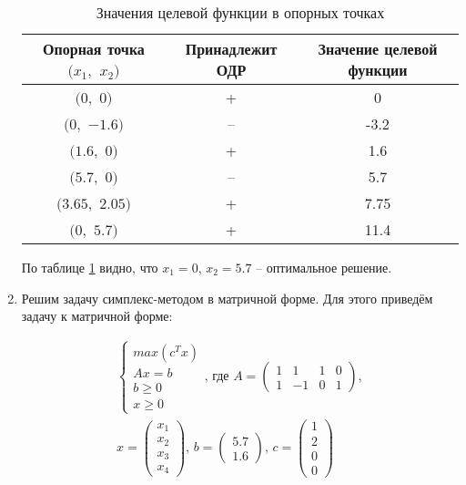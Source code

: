 \begin{enumerate}
\begin{table}[H]
\begin{center}
	\caption{Значения целевой функции в опорных точках}
	\label{tab:target-function}
	\def\tabcolsep{10pt}
	\def\arraystretch{1.23}
	\fontsize{13}{14}\selectfont
	\begin{tabular}{|c|c|c|}
		\hline 
		Опорная точка $(x_1,$ $x_2)$ & Принадлежит ОДР & Значение целевой функции \\ 
		\hline 
		$(0,$ $0)$ & + & 0 \\ 
		\hline 
		$(0,$ $-1.6)$ & -- & -3.2 \\ 
		\hline 
		$(1.6,$ $0)$ & + & 1.6 \\ 
		\hline 
		$(5.7,$ $0)$ & -- & 5.7 \\ 
		\hline 
		$(3.65,$ $2.05)$ & + & 7.75 \\ 
		\hline 
		$(0,$ $5.7)$ & + & 11.4 \\ 
	\hline 
	\end{tabular} 
\end{center}
\end{table}

По таблице \ref{tab:target-function} видно, что $x_1 = 0$, $x_2 = 5.7$ -- оптимальное решение.

\item Решим задачу симплекс-методом в матричной форме. Для этого приведём задачу к матричной форме:

\begin{equation}
\begin{aligned}
\begin{cases}
	max \left( c^T x \right)
	\\
	Ax = b
	\\
	b \geq 0
	\\
	x \geq 0
	\end{cases}
	\text{, где }
	A = \begin{pmatrix}
		1 & 1 & 1 & 0
		\\
		1 & -1 & 0 & 1
	\end{pmatrix},\\
	x = \begin{pmatrix}
		x_1 \\ x_2 \\ x_3 \\ x_4
	\end{pmatrix} \text{, }
	b = \begin{pmatrix}
		5.7 \\ 1.6
	\end{pmatrix} \text{, }
	c = \begin{pmatrix}
		1 \\ 2 \\ 0 \\ 0
	\end{pmatrix}
\end{aligned}
\end{equation}


\end{enumerate}
